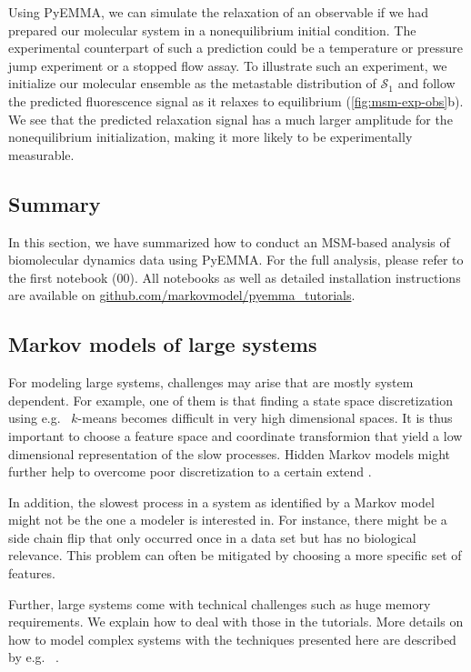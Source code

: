 \documentclass[9pt,tutorial]{livecoms}
\newcommand{\githubrepository}{\url{github.com/markovmodel/pyemma_tutorials}}
\begin{document}
Using PyEMMA, we can simulate the relaxation of an observable if we had prepared our molecular system in a nonequilibrium initial condition.
The experimental counterpart of such a prediction could be a temperature or pressure jump experiment or a stopped flow assay.
To illustrate such an experiment, we initialize our molecular ensemble as the metastable distribution of $\mathcal{S}_1$ and follow the predicted fluorescence signal as it relaxes to equilibrium (\ref{fig:msm-exp-obs}b).
We see that the predicted relaxation signal has a much larger amplitude for the nonequilibrium initialization, making it more likely to be experimentally measurable.

\subsection{Summary}

In this section, we have summarized how to conduct an MSM-based analysis of biomolecular dynamics data using PyEMMA.
For the full analysis, please refer to the first notebook (00).
All notebooks as well as detailed installation instructions are available on \githubrepository{}.

\subsection{Markov models of large systems}
For modeling large systems, challenges may arise that are mostly system dependent. 
For example, one of them is that finding a state space discretization using e.g.~ $k$-means becomes difficult in very high dimensional spaces. 
It is thus important to choose a feature space and coordinate transformion that yield a low dimensional representation of the slow processes.
Hidden Markov models might further help to overcome poor discretization to a certain extend \cite{noe-proj-hid-msm}. 

In addition, the slowest process in a system as identified by a Markov model might not be the one a modeler is interested in. 
For instance, there might be a side chain flip that only occurred once in a data set but has no biological relevance. 
This problem can often be mitigated by choosing a more specific set of features. 

Further, large systems come with technical challenges such as huge memory requirements.
We explain how to deal with those in the tutorials. 
More details on how to model complex systems with the techniques presented here are described by e.g. ~\cite{plattner_protein_2015,plattner_complete_2017}.
\end{document}
